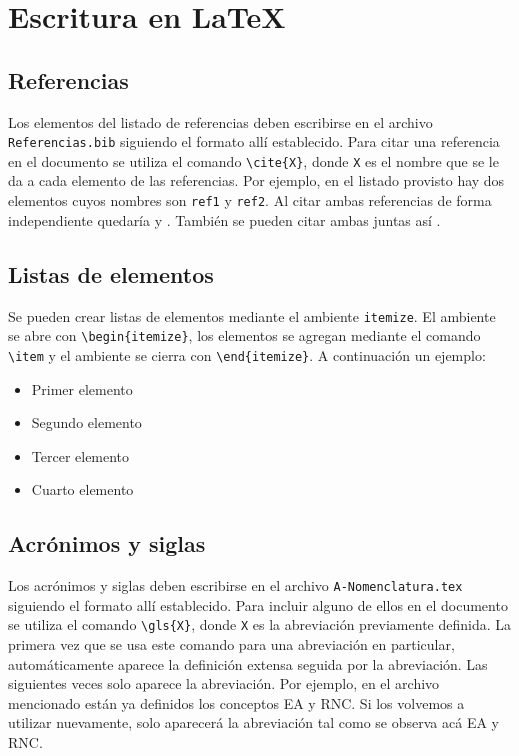 \section{Escritura en LaTeX}

\subsection{Referencias}
Los elementos del listado de referencias deben escribirse en el archivo \verb!Referencias.bib! siguiendo el formato allí establecido. Para citar una referencia en el documento se utiliza el comando \verb!\cite{X}!, donde \verb!X! es el nombre que se le da a cada elemento de las referencias. Por ejemplo, en el listado provisto hay dos elementos cuyos nombres son \verb!ref1! y \verb!ref2!. Al citar ambas referencias de forma independiente quedaría \cite{ref1} y \cite{ref2}. También se pueden citar ambas juntas así \cite{ref1, ref2}.

\subsection{Listas de elementos}
Se pueden crear listas de elementos mediante el ambiente \verb!itemize!. El ambiente se abre con \verb!\begin{itemize}!, los elementos se agregan mediante el comando \verb!\item! y el ambiente se cierra con \verb!\end{itemize}!. A continuación un ejemplo:

\begin{itemize}
    \item Primer elemento
    \item Segundo elemento
    \item Tercer elemento
    \item Cuarto elemento
\end{itemize}

\subsection{Acrónimos y siglas}
Los acrónimos y siglas deben escribirse en el archivo \verb!A-Nomenclatura.tex! siguiendo el formato allí establecido. Para incluir alguno de ellos en el documento se utiliza el comando \verb!\gls{X}!, donde \verb!X! es la abreviación previamente definida. La primera vez que se usa este comando para una abreviación en particular, automáticamente aparece la definición extensa seguida por la abreviación. Las siguientes veces solo aparece la abreviación. Por ejemplo, en el archivo mencionado están ya definidos los conceptos \gls{EA} y \gls{RNC}. Si los volvemos a utilizar nuevamente, solo aparecerá la abreviación tal como se observa acá \gls{EA} y \gls{RNC}.


